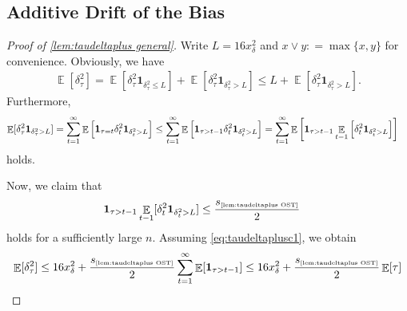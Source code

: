 \documentclass[letterpaper,11pt]{article}
\def\defeq{\mathrel{\mathop:}=}
\newcommand{\indicator}{\mathbf{1}}
\DeclareMathOperator*{\E}{\mathbb{E}}
\newcommand{\varianceref}[1]{\variance_{\mbox{\tiny\ref{#1}}}}
\newcommand{\variance}{s}
\newcommand{\xdelta}{x_{\delta}}
\newcommand{\Cdeltavarplus}{C_{\delta}}
\begin{document}
\subsection{Additive Drift of the Bias}\label{sec:deferred gap grows}
\begin{proof}[Proof of \cref{lem:taudeltaplus general}]
    Write $L=16\xdelta^2$ and $x\vee y\defeq \max\{x,y\}$ for convenience.
    Obviously, we have
    \begin{align*}
        \E[\delta_{\tau}^2]
        =\E[\delta_{\tau}^2\indicator_{\delta_\tau^2\leq L}]+\E[\delta_{\tau}^2\indicator_{\delta_\tau^2> L}]
        \leq L+\E[\delta_{\tau}^2\indicator_{\delta_\tau^2> L}].
    \end{align*}
    Furthermore, 
    \begin{align*}
        \E[\delta_{\tau}^2\indicator_{\delta_\tau^2> L}]
        &=\sum_{t=1}^\infty\E\qty[\indicator_{\tau=t}\delta_{t}^2\indicator_{\delta_t^2> L}]
        \leq \sum_{t=1}^\infty\E\qty[\indicator_{\tau>t-1}\delta_{t}^2\indicator_{\delta_t^2> L}]
        =\sum_{t=1}^\infty\E\qty[\indicator_{\tau>t-1}\E_{t-1}\qty[\delta_{t}^2\indicator_{\delta_t^2> L}]]
    \end{align*}
    holds. 

    Now, we claim that
    \begin{align}
        \indicator_{\tau>t-1}\E_{t-1}[\delta_{t}^2\indicator_{\delta_t^2> L}]
        &\leq \frac{\varianceref{lem:taudeltaplus OST}}{2} \label{eq:taudeltaplusc1}
    \end{align}
    holds for a sufficiently large $n$.
    Assuming \cref{eq:taudeltaplusc1}, we obtain
    \begin{align*}
        \E[\delta_{\tau}^2]
        \leq 16\xdelta^2+\frac{\varianceref{lem:taudeltaplus OST}}{2}\sum_{t=1}^\infty\E[\indicator_{\tau>t-1}]\leq 16\xdelta^2+\frac{\varianceref{lem:taudeltaplus OST}}{2}\E[\tau]
    \end{align*}
    


\end{proof}
\end{document}
